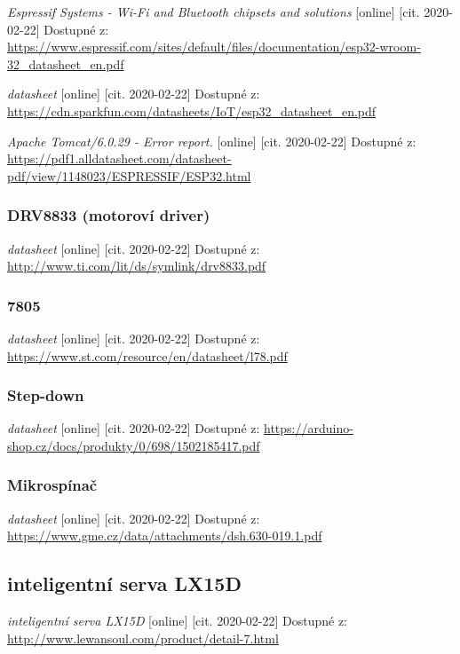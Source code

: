 \documentclass{template/socthesis}
\begin{document}
\begin{thebibliography}{1}
	\textit{Espressif Systems - Wi-Fi and Bluetooth chipsets and solutions } [online] [cit. 2020-02-22] Dostupné z:
	\url{https://www.espressif.com/sites/default/files/documentation/esp32-wroom-32_datasheet_en.pdf}
	
	\textit{datasheet} [online] [cit. 2020-02-22] Dostupné z:
	\url{https://cdn.sparkfun.com/datasheets/IoT/esp32_datasheet_en.pdf}
	
	\textit{Apache Tomcat/6.0.29 - Error report.} [online] [cit. 2020-02-22] Dostupné z:
	\url{https://pdf1.alldatasheet.com/datasheet-pdf/view/1148023/ESPRESSIF/ESP32.html}
	
	\subsubsection{DRV8833 (motoroví driver)}
	
	\textit{datasheet} [online] [cit. 2020-02-22] Dostupné z:
	\url{http://www.ti.com/lit/ds/symlink/drv8833.pdf}
	
	\subsubsection{7805}
	
	\textit{datasheet} [online] [cit. 2020-02-22] Dostupné z:
	\url{https://www.st.com/resource/en/datasheet/l78.pdf}
	
	\subsubsection{Step-down}
	
	\textit{datasheet} [online] [cit. 2020-02-22] Dostupné z:
	\url{https://arduino-shop.cz/docs/produkty/0/698/1502185417.pdf}
	
	\subsubsection{Mikrospínač}
	
	\textit{datasheet} [online] [cit. 2020-02-22] Dostupné z:
	\url{https://www.gme.cz/data/attachments/dsh.630-019.1.pdf}
	
	\subsection{inteligentní serva LX15D}
	
	\textit{inteligentní serva LX15D} [online] [cit. 2020-02-22] Dostupné z:
	\url{http://www.lewansoul.com/product/detail-7.html}
	
\end{thebibliography}
\end{document}

